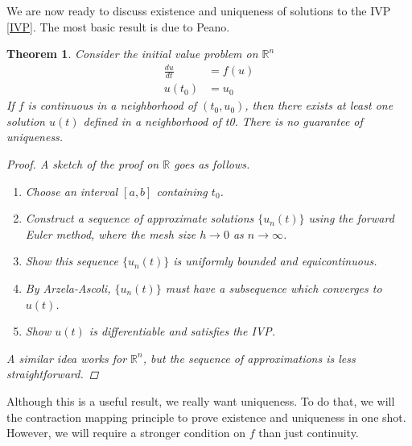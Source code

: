 \documentclass{article}
\newtheorem{theorem}{Theorem}[section]
\def\R{{\mathbb R}}
\begin{document}
We are now ready to discuss existence and uniqueness of solutions to the IVP \eqref{IVP}. The most basic result is due to Peano.


\begin{theorem}
Consider the initial value problem on $\R^n$
\begin{align}
\frac{du}{dt} &= f(u) \\
u(t_0) &= u_0 \nonumber
\end{align}
If $f$ is continuous in a neighborhood of $(t_0, u_0)$, then there exists at least one solution $u(t)$ defined in a neighborhood of t0. There is no guarantee of uniqueness.
\begin{proof}
A sketch of the proof on $\R$ goes as follows.
\begin{enumerate}
	\item Choose an interval $[a, b]$ containing $t_0$.
	\item Construct a sequence of approximate solutions $\{ u_n(t) \}$ using the forward Euler method, where the mesh size $h \rightarrow 0$ as $n \rightarrow \infty$.
	\item Show this sequence $\{ u_n(t) \}$ is uniformly bounded and equicontinuous.
	\item By Arzela-Ascoli, $\{ u_n(t) \}$ must have a subsequence which converges to $u(t)$.
	\item Show $u(t)$ is differentiable and satisfies the IVP. 
\end{enumerate}
A similar idea works for $\R^n$, but the sequence of approximations is less straightforward.
\end{proof}
\end{theorem}

Although this is a useful result, we really want uniqueness. To do that, we will the contraction mapping principle to prove existence and uniqueness in one shot. However, we will require a stronger condition on $f$ than just continuity.

\end{document}
